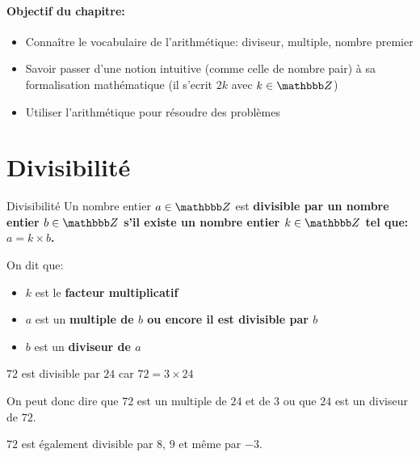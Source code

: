 \documentclass[10pt,a4paper,openany,twoside,prof]{book}
\begin{document}
	\entetegal{}

	\vspace{-7mm}
	\paragraph*{Objectif du chapitre:}
	\begin{itemize}
		\vspace{-2mm}
		\setlength\itemsep{-1mm}
		\item Connaître le vocabulaire de l'arithmétique: diviseur, multiple, nombre premier
		\item Savoir passer d'une notion intuitive (comme celle de nombre pair) à sa formalisation mathématique (il s'ecrit $2k$ avec $k\in\Z$)
		\item Utiliser l'arithmétique pour résoudre des problèmes
	\end{itemize}
	\vspace{-4mm}

\section{Divisibilité}

\begin{defi}{Divisibilité}{}
Un nombre entier $a\in\Z$ est \bf{divisible} par un nombre entier $b\in\Z$ s'il existe un nombre entier $k\in\Z$ tel que: $a=k\times b$.

On dit que:
\begin{itemize}
	\item $k$ est le \bf{facteur multiplicatif}
	\item $a$ est un \bf{multiple} de $b$ ou encore il est \bf{divisible} par $b$
	\item $b$ est un \bf{diviseur} de $a$
\end{itemize}
\end{defi}

\begin{ex}{}{}
$72$ est divisible par $24$ car $72 = 3\times 24$

 On peut donc dire que $72$ est un multiple de $24$ et de $3$ ou que $24$ est un diviseur de $72$.
\end{ex}

\begin{rem}
	$72$ est également divisible par $8$, $9$ et même par $-3$.
\end{rem}
\end{document}
